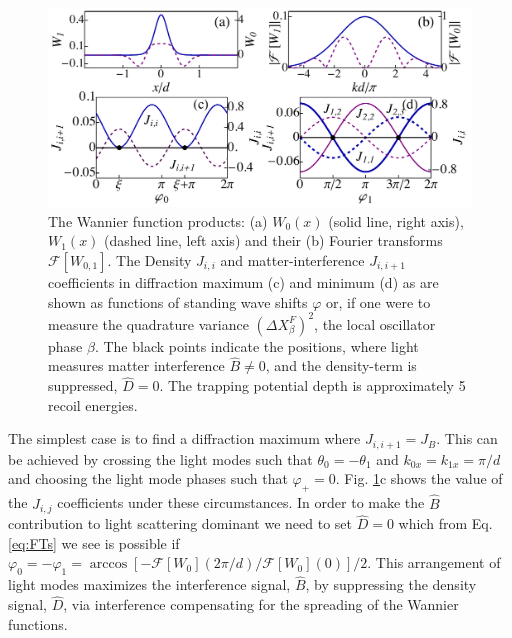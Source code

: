 \begin{figure}[htbp!]
  \begin{center}
    \includegraphics[width=\linewidth]{WF_S}
  \end{center}
  \caption[Wannier Function Fourier Transforms]{The Wannier function
    products: (a) $W_0(x)$ (solid line, right axis), $W_1(x)$ (dashed
    line, left axis) and their (b) Fourier transforms
    $\mathcal{F}[W_{0,1}]$. The Density $J_{i,i}$ and
    matter-interference $J_{i,i+1}$ coefficients in diffraction
    maximum (c) and minimum (d) as are shown as functions of standing
    wave shifts $\varphi$ or, if one were to measure the quadrature
    variance $(\Delta X^F_\beta)^2$, the local oscillator phase
    $\beta$. The black points indicate the positions, where light
    measures matter interference $\hat{B} \ne 0$, and the density-term
    is suppressed, $\hat{D} = 0$. The trapping potential depth is
    approximately 5 recoil energies.}
  \label{fig:WannierFT}
\end{figure}

The simplest case is to find a diffraction maximum where $J_{i,i+1} =
J_B$. This can be achieved by crossing the light modes such that
$\theta_0 = -\theta_1$ and $k_{0x} = k_{1x} = \pi/d$ and choosing the
light mode phases such that $\varphi_+ = 0$. Fig. \ref{fig:WannierFT}c
shows the value of the $J_{i,j}$ coefficients under these
circumstances. In order to make the $\hat{B}$ contribution to light
scattering dominant we need to set $\hat{D} = 0$ which from
Eq. \eqref{eq:FTs} we see is possible if $\varphi_0 = -\varphi_1 =
\arccos[-\mathcal{F}[W_0](2\pi/d)/\mathcal{F}[W_0](0)]/2$. This
arrangement of light modes maximizes the interference signal,
$\hat{B}$, by suppressing the density signal, $\hat{D}$, via
interference compensating for the spreading of the Wannier
functions. 


